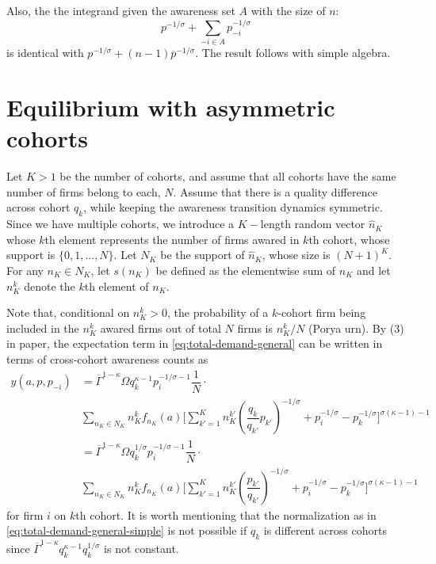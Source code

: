 \documentclass[12pt]{article}
\theoremstyle{definition}
\begin{document}
Also, the the integrand given the awareness set $A$ with the size of $n$: 
$$
p^{-1/\sigma} + \sum_{-i \in A} p_{-i}^{-1/\sigma}
$$
is identical with $p ^{-1/\sigma} + (n-1) \overline{p}^{-1/\sigma}$. The result follows with simple algebra.


\section{Equilibrium with asymmetric cohorts}
Let $K > 1$ be the number of cohorts, and assume that all cohorts have the same number of firms belong to each, $N$. Assume that there is a quality difference across cohort $q_{k}$, while keeping the awareness transition dynamics symmetric.  Since we have multiple cohorts, we introduce a $K-$length random vector $\widehat n_K$ whose $k$th element represents the number of firms awared in $k$th cohort, whose support is $\{0, 1,..., N\}$. Let $N_K$ be the support of $\widehat  n_K$, whose size is $(N+1)^K$.  For any $n_K \in N_K$, let $s(n_K)$ be defined as the elementwise sum of $n_K$ and let $n_K^k$ denote the $k$th element of $n_K$.

Note that, conditional on $n^k_K > 0$, the probability of a $k$-cohort firm being included in the $n^k_K$ awared firms out of total $N$ firms is $n^k_K/N$ (Porya urn). By (3) in paper, the expectation term in \autoref{eq:total-demand-general} can be written in terms of cross-cohort awareness counts as
\begin{equation}
\begin{aligned}
y(a, p, p_{-i}) &=  \overline{\Gamma}^{1 - \kappa} \Omega q_k^{\kappa-1} p_i^{-1/\sigma-1} \dfrac{1}{N} \cdot \\ 
&\sum_{ n_K \in N_K } n^k_K f_{n_K}(a) \Bigg[ \sum_{k' =1 }^K n_K^{k'} \left( \dfrac{q_k}{q_{k'}} p_{k'} \right)^{-1/\sigma} +   
 p_i^{-1/\sigma}   - p^{-1/\sigma}_{k}  \Bigg]^{\sigma(\kappa-1) -1}  \\ 
 &=  \overline{\Gamma}^{1 - \kappa} \Omega q_k^{1/\sigma} p_i^{-1/\sigma-1} \dfrac{1}{N} \cdot \\ 
 &\sum_{ n_K \in N_K } n^k_K f_{n_K}(a) \Bigg[ \sum_{k' =1 }^K n_K^{k'} \left( \dfrac{p_{k'}}{q_{k'}}  \right)^{-1/\sigma} +   
 p_i^{-1/\sigma}   - p^{-1/\sigma}_{k}  \Bigg]^{\sigma(\kappa-1) -1}
\end{aligned}
\end{equation}
for firm $i$ on $k$th cohort. It is worth mentioning that the normalization as in \autoref{eq:total-demand-general-simple} is not possible if $q_k$ is different across cohorts  since $\overline{\Gamma}^{1-\kappa}  q_k^{\kappa-1} q_k^{1/\sigma}$ is not constant.
\end{document}
